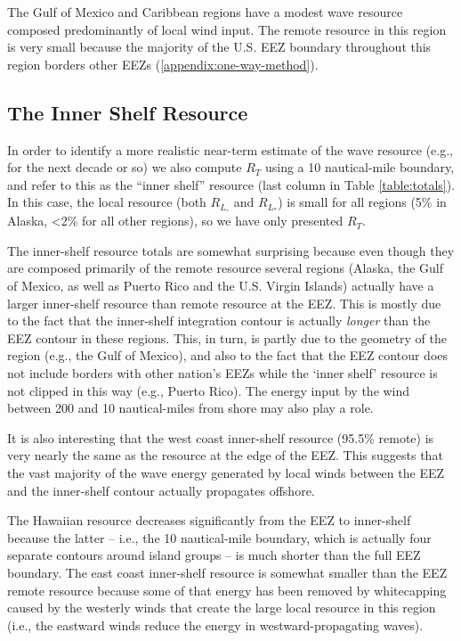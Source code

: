 The Gulf of Mexico and Caribbean regions have a modest wave resource composed predominantly of local wind input. The remote resource in this region is very small because the majority of the U.S. EEZ boundary throughout this region borders other EEZs (\ref{appendix:one-way-method}).

\subsection{The Inner Shelf Resource}

In order to identify a more realistic near-term estimate of the wave resource (e.g., for the next decade or so) we also compute $R_T$ using a 10 nautical-mile boundary, and refer to this as the ``inner shelf'' resource (last column in Table \ref{table:totals}). In this case, the local resource (both $R_{L_\circ}$ and $R_{L_*}$) is small for all regions (5\% in Alaska, <2\% for all other regions), so we have only presented $R_T$.

The inner-shelf resource totals are somewhat surprising because even though they are composed primarily of the remote resource several regions (Alaska, the Gulf of Mexico, as well as Puerto Rico and the U.S. Virgin Islands) actually have a larger inner-shelf resource than remote resource at the EEZ. This is mostly due to the fact that the inner-shelf integration contour is actually {\em longer} than the EEZ contour in these regions. This, in turn, is partly due to the geometry of the region (e.g., the Gulf of Mexico), and also to the fact that the EEZ contour does not include borders with other nation's EEZs while the `inner shelf' resource is not clipped in this way (e.g., Puerto Rico). The energy input by the wind between 200 and 10 nautical-miles from shore may also play a role. 

It is also interesting that the west coast inner-shelf resource (95.5\% remote) is very nearly the same as the resource at the edge of the EEZ. This suggests that the vast majority of the wave energy generated by local winds between the EEZ and the inner-shelf contour actually propagates offshore.

The Hawaiian resource decreases significantly from the EEZ to inner-shelf because the latter -- i.e., the 10 nautical-mile boundary, which is actually four separate contours around island groups -- is much shorter than the full EEZ boundary. The east coast inner-shelf resource is somewhat smaller than the EEZ remote resource because some of that energy has been removed by whitecapping caused by the westerly winds that create the large local resource in this region (i.e., the eastward winds reduce the energy in westward-propagating waves).

